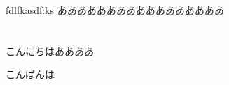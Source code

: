 \documentclass[dvipdfmx,report,11pt]{jsarticle}
\title{}
\author{funaki}
\date{\today}
\begin{document}
\newcommand{\ctext}[1]{\raise0.2ex\hbox{\textcircled{\scriptsize{#1}}}}
\maketitle

fdlfkasdf:ks
あああああああああああああああああ
\section{}
こんにちはああああ

こんばんは
\end{document}

